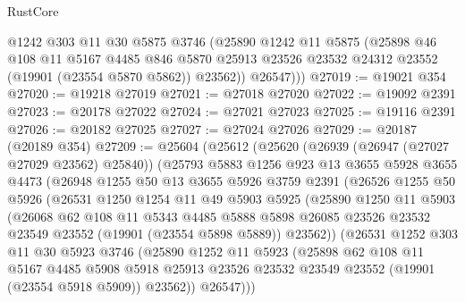 \begin{lexlean}{RustCore}
\begin{coremodule}
          @1242
          @303
          @11
          @30
          @5875
          @3746
          (@25890
            @1242
            @11
            @5875
            (@25898
              @46
              @108
              @11
              @5167
              @4485
              @846
              @5870
              @25913
              @23526
              @23532
              @24312
              @23552
              (@19901 (@23554 @5870 @5862))
              @23562))
          @26547)))
@27019 := @19021 @354
@27020 := @19218 @27019
@27021 := @27018 @27020
@27022 := @19092 @2391
@27023 := @20178 @27022
@27024 := @27021 @27023
@27025 := @19116 @2391
@27026 := @20182 @27025
@27027 := @27024 @27026
@27029 := @20187 (@20189 @354)
@27209 := @25604
    (@25612
      (@25620
        (@26939 (@26947 (@27027 @27029 @23562) @25840))
        (@25793
          @5883
          @1256
          @923
          @13
          @3655
          @5928
          @3655
          @4473
          (@26948
            @1255
            @50
            @13
            @3655
            @5926
            @3759
            @2391
            (@26526
              @1255
              @50
              @5926
              (@26531
                @1250
                @1254
                @11
                @49
                @5903
                @5925
                (@25890
                  @1250
                  @11
                  @5903
                  (@26068
                    @62
                    @108
                    @11
                    @5343
                    @4485
                    @5888
                    @5898
                    @26085
                    @23526
                    @23532
                    @23549
                    @23552
                    (@19901 (@23554 @5898 @5889))
                    @23562))
                (@26531
                  @1252
                  @303
                  @11
                  @30
                  @5923
                  @3746
                  (@25890
                    @1252
                    @11
                    @5923
                    (@25898
                      @62
                      @108
                      @11
                      @5167
                      @4485
                      @5908
                      @5918
                      @25913
                      @23526
                      @23532
                      @23549
                      @23552
                      (@19901 (@23554 @5918 @5909))
                      @23562))
                  @26547)))

\end{coremodule}
\end{lexlean}
